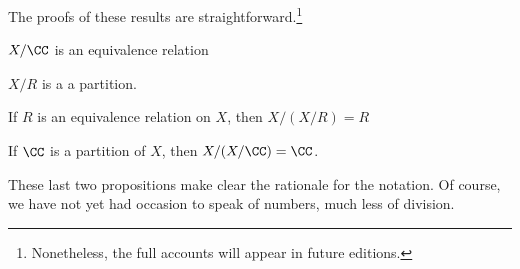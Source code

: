 The proofs of these results are straightforward.\footnote{Nonetheless, the full accounts will appear in future editions.}

\begin{proposition}
  $X/\CC$ is an equivalence relation
\end{proposition}
\begin{proposition}
  $X/R$ is a a partition.
\end{proposition}

\begin{proposition}
  If $R$ is an equivalence relation on $X$, then $X/(X/R) = R$
\end{proposition}

\begin{proposition}
  If $\CC$ is a partition of $X$, then $X/(X/\CC) = \CC$.
\end{proposition}

These last two propositions make clear the rationale for the notation.
Of course, we have not yet had occasion to speak of numbers, much less of division.



%
%
%
%
%
%
%
%
